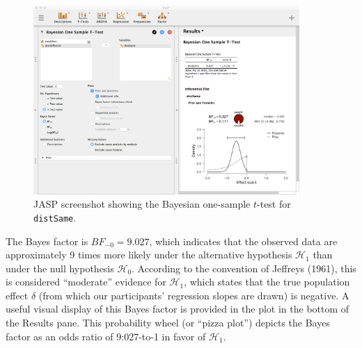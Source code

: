 \documentclass[english,,doc,floatsintext]{apa6}
\begin{document}
\begin{figure}
\centering
\includegraphics[width=0.9\textwidth,height=\textheight]{figures/ttestBayes.png}
\caption{\label{fig:ttestBayes}JASP screenshot showing the Bayesian one-sample \(t\)-test for \texttt{distSame}.}
\end{figure}

The Bayes factor is \(BF_{-0}=9.027\), which indicates that the observed data are approximately 9 times more likely under the alternative hypothesis \(\mathcal{H}_1\) than under the null hypothesis \(\mathcal{H}_0\). According to the convention of Jeffreys (1961), this is considered \enquote{moderate} evidence for \(\mathcal{H}_1\), which states that the true population effect \(\delta\) (from which our participants' regression slopes are drawn) is negative. A useful visual display of this Bayes factor is provided in the plot in the bottom of the Results pane. This probability wheel (or \enquote{pizza plot}) depicts the Bayes factor as an odds ratio of 9:027-to-1 in favor of \(\mathcal{H}_1\).
\end{document}
